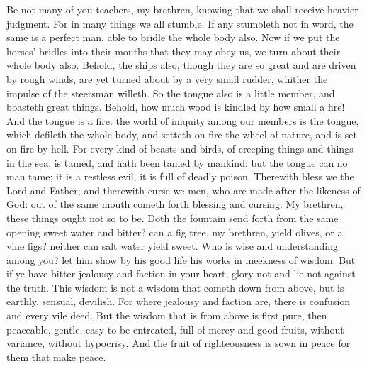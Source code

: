 Be not many of you teachers, my brethren, knowing that we shall receive heavier judgment. For in many things we all stumble. If any stumbleth not in word, the same is a perfect man, able to bridle the whole body also. Now if we put the horses’ bridles into their mouths that they may obey us, we turn about their whole body also. Behold, the ships also, though they are so great and are driven by rough winds, are yet turned about by a very small rudder, whither the impulse of the steersman willeth. So the tongue also is a little member, and boasteth great things. Behold, how much wood is kindled by how small a fire! And the tongue is a fire: the world of iniquity among our members is the tongue, which defileth the whole body, and setteth on fire the wheel of nature, and is set on fire by hell. For every kind of beasts and birds, of creeping things and things in the sea, is tamed, and hath been tamed by mankind: but the tongue can no man tame; it is a restless evil, it is full of deadly poison. Therewith bless we the Lord and Father; and therewith curse we men, who are made after the likeness of God: out of the same mouth cometh forth blessing and cursing. My brethren, these things ought not so to be. Doth the fountain send forth from the same opening sweet water and bitter? can a fig tree, my brethren, yield olives, or a vine figs? neither can salt water yield sweet.  Who is wise and understanding among you? let him show by his good life his works in meekness of wisdom. But if ye have bitter jealousy and faction in your heart, glory not and lie not against the truth. This wisdom is not a wisdom that cometh down from above, but is earthly, sensual, devilish. For where jealousy and faction are, there is confusion and every vile deed. But the wisdom that is from above is first pure, then peaceable, gentle, easy to be entreated, full of mercy and good fruits, without variance, without hypocrisy. And the fruit of righteousness is sown in peace for them that make peace. 

